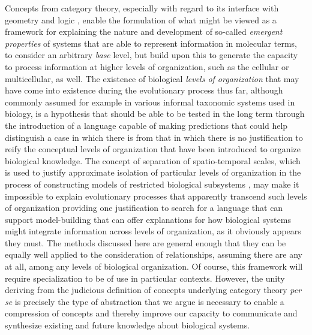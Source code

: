 \documentclass[aps,twocolumn]{revtex4-1}
\begin{document}
Concepts from category theory, especially with regard to its interface with geometry and logic \cite{MacLane1992,Jacobs1998}, enable the formulation of what might be viewed as a framework for explaining the nature and development of so-called \emph{emergent properties} of systems that are able to represent information in molecular terms, to consider an arbitrary {\it base} level, but build upon this to generate the capacity to process information at higher levels of organization, such as the cellular or multicellular, as well. The existence of biological {\it levels of organization} that may have come into existence during the evolutionary process thus far, although commonly assumed for example in various informal taxonomic systems used in biology, is a hypothesis that should be able to be tested in the long term through the introduction of a language capable of making predictions that could help distinguish a case in which there is from that in which there is no justification to reify the conceptual levels of organization that have been introduced to organize biological knowledge. The concept of separation of spatio-temporal scales, which is used to justify approximate isolation of particular levels of organization in the process of constructing models of restricted biological subsystems \cite{Gunawardena2012,Karr2012}, may make it impossible to explain evolutionary processes that apparently transcend such levels of organization providing one justification to search for a language that can support model-building that can offer explanations for how biological systems might integrate information across levels of organization, as it obviously appears they must. The methods discussed here are general enough that they can be equally well applied to the consideration of relationships, assuming there are any at all, among any levels of biological organization. Of course, this framework will require specialization to be of use in particular contexts. However, the unity deriving from the judicious definition of concepts underlying category theory {\it per se} is precisely the type of abstraction that we argue is necessary to enable a compression of concepts and thereby improve our capacity to communicate and synthesize existing and future knowledge about biological systems.
\end{document}
